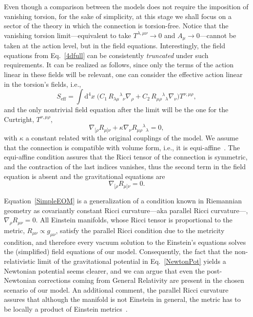 \documentclass[aps,prd,12pt,twocolumn,superscriptaddress,showpacs,showkeys,reprint%
]{revtex4-1}
\newcommand\nab[1]{\nabla_{{#1}}}
\renewcommand{\(}{\left(}
\renewcommand{\)}{\right)}
\renewcommand{\[}{\left[}
\renewcommand{\]}{\right]}
\newcommand{\dn}[2]{{\mathrm{d}}^{#1}{#2}\;}
\newcommand{\hl}[1]{{\color{red} \bfseries{#1}}}
\begin{document}
Even though a comparison between the models does not require the imposition of vanishing torsion, for the sake of simplicity, at this stage we shall focus on a sector of the theory in which the connection is torsion-free. Notice that the vanishing torsion limit---equivalent to take $T^{\lambda,\mu\nu} \to 0$ and $A_\mu \to 0$---cannot be taken at the action level, but in the field equations. Interestingly, the field equations from Eq.~\eqref{4dfull} can be consistently \emph{truncated} under such requirements. It can be realized as follows, since only the terms of the action linear in these fields will be relevant, one can consider the effective action linear in the torsion's fields, i.e.,
\begin{equation}
  \label{eff-action}
  S_{\text{eff}} = \int\dn{4}{x} \Big( C_1\, R_{\lambda\mu}{}^{\lambda}{}_\nu \nabla_\rho %
  + C_2 \, R_{\mu\rho}{}^{\lambda}{}_\lambda \nabla_\nu \Big) T^{\nu,\mu\rho} ,
\end{equation}
and the only nontrivial field equation after the limit will be the one for the Curtright, $T^{\nu,\mu\rho}$,
\begin{equation}
  \nab{[\rho} R_{\mu]\nu} + \kappa \nab{\nu} R_{\mu\rho}{}^\lambda{}_\lambda = 0,
  \label{almostSimpleEOM}
\end{equation}
with $\kappa$ a constant related with the original couplings of the model. We assume that the connection is compatible with volume form, i.e., it is equi-affine~\cite{nomizu1994affine,MO-Bryant02}.  The equi-affine condition assures that the Ricci tensor of the connection is symmetric, and the contraction of the last indices vanishes, thus the second term in the field equation is absent and the gravitational equations are
\begin{equation}
  \nab{[\rho} R_{\mu]\nu} = 0.
  \label{SimpleEOM}
\end{equation}

Equation~\eqref{SimpleEOM} is a generalization of a condition known in Riemannian geometry as covariantly constant Ricci curvature---aka parallel Ricci curvature---, \mbox{$\nab{\rho} R_{\mu\nu} = 0$.}  All Einstein manifolds, whose Ricci tensor is proportional to the metric, \mbox{$R_{\mu\nu} \propto g_{\mu\nu}$,} satisfy the parallel Ricci condition due to the metricity condition, and therefore every vacuum solution to the Einstein's equations solves the (simplified) field equations of our model. Consequently, the fact that the non-relativistic limit of the gravitational potential in Eq.~\eqref{NewtonPot} yields a Newtonian potential seems clearer, and we can argue that even the post-Newtonian corrections coming from General Relativity are present in the chosen scenario of our model. An additional comment, the parallel Ricci curvature assures that although the manifold is not Einstein in general, the metric has to be locally a product of Einstein metrics~\cite{Besse}.
\end{document}
